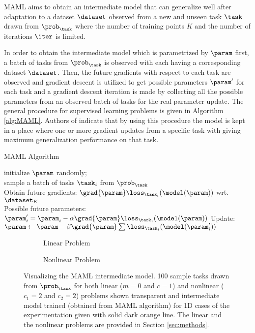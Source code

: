 MAML aims to obtain an intermediate model that can generalize well after adaptation to a dataset $\dataset$ observed from a new and unseen task $\task$ drawn from $\prob_\task$ where the number of training points $K$ and the number of iterations $\iter$ is limited.  

In order to obtain the intermediate model which is parametrized by $\param$ first, a batch of tasks from $\prob_{\task}$ is observed with each having a corresponding dataset $\dataset$. Then, the future gradients with respect to each task are observed and gradient descent is utilized to get possible parameters $\param^\prime$ for each task and a gradient descent iteration is made by collecting all the possible parameters from an observed batch of tasks for the real parameter update. The general procedure for supervised learning problems is given in Algorithm \ref{alg:MAML}. Authors of \cite{finn2017} indicate that by using this procedure the model is kept in a place where one or more gradient updates from a specific task with giving maximum generalization performance on that task.

\begin{algorithm}
  \caption{MAML\cite{finn2017} Algorithm}\label{alg:MAML}
  \KwData{$\prob_{\task}$, $\alpha$, $\beta$}
  initialize $\param$ randomly; \\
  {
    sample a batch of tasks $\task_i$ from $\prob_{\task}$\\
    {
      Obtain future gradients: $\grad{\param}\loss_{\task_i}(\model(\param))$ wrt. $\dataset_K$ \\
      Possible future parameters: $\param_i^\prime = \param_i -\alpha\grad{\param}\loss_{\task_i}(\model(\param))$
    }
    Update: $\param \leftarrow \param- \beta\grad{\param}\sum\loss_{\task_i}(\model(\param_i^\prime))$
  }
\end{algorithm}

\begin{figure}[ht!]
  \centering
  \begin{subfigure}[b]{0.49\textwidth}
    \centering
    \caption{Linear Problem}
    \label{fig:lin_maml}
  \end{subfigure}
  \begin{subfigure}[b]{0.49\textwidth}
    \centering
    \caption{Nonlinear Problem}
    \label{fig:nonlin_maml}
  \end{subfigure}
  \caption{Visualizing the MAML intermediate model. 100 sample tasks drawn from $\prob_\task$ for both linear ($m=0$ and $c=1$) and nonlinear ($c_1=2$ and $c_2=2$) problems shown transparent and intermediate model trained (obtained from MAML algorithm) for 1D cases of the experimentation given with solid dark orange line. The linear and the nonlinear problems are provided in Section \ref{sec:methods}.}
\end{figure}


